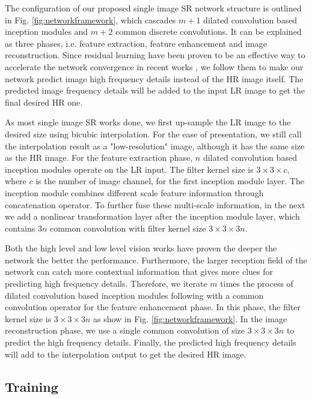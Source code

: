 \documentclass{article}
\begin{document}
The configuration of our proposed single image SR network structure is outlined in Fig. \ref{fig:networkframework}, which cascades $m + 1$ dilated convolution based inception modules and $m + 2$ common discrete convolutions. It can be explained as three phases, i.e. feature extraction, feature enhancement and image reconstruction. Since residual learning have been proven to be an effective way to accelerate the network convergence in recent works \cite{ref9}, we follow them to make our network predict image high frequency details instead of the HR image itself. The predicted image frequency details will be added to the input LR image to get the final desired HR one.

As most single image SR works done, we first up-sample the LR image to the desired size using bicubic interpolation. For the ease of presentation, we still call the interpolation result as a "low-resolution" image, although it has the same size as the HR image. For the feature extraction phase, $n$ dilated convolution based inception modules operate on the LR input. The filter kernel size is $3 \times 3 \times c$, where $c$ is the number of image channel, for the first inception module layer. The inception module combines different scale feature information through concatenation operator. To further fuse these multi-scale information, in the next we add a nonlinear transformation layer after the inception module layer, which contains $3n$ common convolution with filter kernel size $3 \times 3 \times 3n$. 

Both the high level and low level vision works have proven the deeper the network the better the performance. Furthermore, the larger reception field of the network can catch more contextual information that gives more clues for predicting high frequency details. Therefore, we iterate $m$ times the process of dilated convolution based inception modules following with a common convolution operator for the feature enhancement phase. In this phase, the filter kernel size is $3 \times 3 \times 3n$ as show in Fig. \ref{fig:networkframework}. In the image reconstruction phase, we use a single common convolution of size $3 \times 3 \times 3n$ to predict the high frequency details. Finally, the predicted high frequency details will add to the interpolation output to get the desired HR image.

\subsection{Training}
\label{subsec:training}
\end{document}
